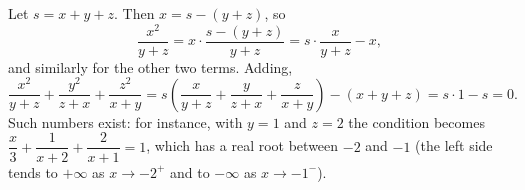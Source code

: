 Let $s=x+y+z$. Then $x=s-(y+z)$, so
\[
\dfrac{x^2}{y+z}=x\cdot\dfrac{s-(y+z)}{y+z}=s\cdot\dfrac{x}{y+z}-x ,
\]
and similarly for the other two terms. Adding,
\[
\dfrac{x^2}{y+z}+\dfrac{y^2}{z+x}+\dfrac{z^2}{x+y}=s\left(\dfrac{x}{y+z}+\dfrac{y}{z+x}+\dfrac{z}{x+y}\right)-(x+y+z)=s\cdot1-s=\boxed{0}.
\]
Such numbers exist: for instance, with $y=1$ and $z=2$ the condition becomes $\dfrac{x}{3}+\dfrac{1}{x+2}+\dfrac{2}{x+1}=1$, which has a real root between $-2$ and $-1$ (the left side tends to $+\infty$ as $x\to-2^+$ and to $-\infty$ as $x\to-1^-$).
